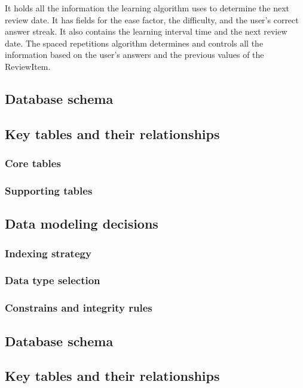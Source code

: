 It holds all the information the learning algorithm uses to determine the next review date. It has fields for the ease factor, the difficulty, and the user's correct answer streak. It also contains the learning interval time and the next review date. The spaced repetitions algorithm determines and controls all the information based on the user's answers and the previous values of the ReviewItem.

\subsection{Database schema}

\subsection{Key tables and their relationships}

\subsubsection{Core tables}
    
\subsubsection{Supporting tables}
    
\subsection{Data modeling decisions}

\subsubsection{Indexing strategy}

\subsubsection{Data type selection}

\subsubsection{Constrains and integrity rules}

\subsection{Database schema}

\subsection{Key tables and their relationships}

